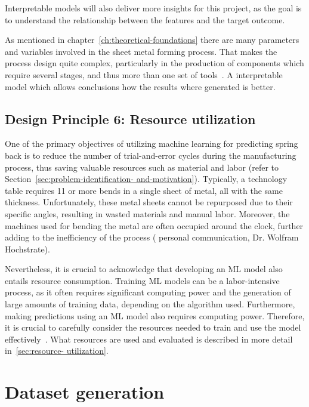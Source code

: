 Interpretable models will also deliver more insights for this project, as the
goal is to understand the relationship between the features and the target outcome.

As mentioned in chapter~\ref{ch:theoretical-foundations} there are many parameters
and variables involved in the sheet metal forming process.
That makes the process design quite complex, particularly in the production
of components which require several stages, and thus more than one set of tools~\cite[p.
1]{dib_singleensembleclassifiers_2020}.
A interpretable model which allows conclusions how the results where generated is better.

\subsection*{Design Principle 6: Resource utilization}
One of the primary objectives of utilizing machine learning for predicting spring back is to
reduce the number of trial-and-error cycles during the manufacturing process, thus saving
valuable resources such as material and labor (refer to Section~\ref{sec:problem-identification-
and-motivation}).
Typically, a technology table requires 11 or more bends in a single sheet of metal, all with the
same thickness.
Unfortunately, these metal sheets cannot be repurposed due to their specific angles,
resulting in wasted materials and manual labor.
Moreover, the machines used for bending the metal
are often occupied around the clock, further adding to the inefficiency of the process (
personal communication, Dr. Wolfram Hochstrate).

Nevertheless, it is crucial to acknowledge that developing an ML model also entails resource
consumption.
Training \ac{ML} models can be a labor-intensive process, as it often requires significant
computing power and the generation of large amounts of training data, depending on the algorithm
used.
Furthermore, making predictions using an \ac{ML} model also requires computing power.
Therefore, it is crucial to carefully consider the resources needed to train and use the model
effectively~\cite[p. 16]{siebert2022construction}.
What resources are used and evaluated is described in more detail in~\ref{sec:resource-
utilization}.


\section{Dataset generation}\label{sec:dataset-generation}

